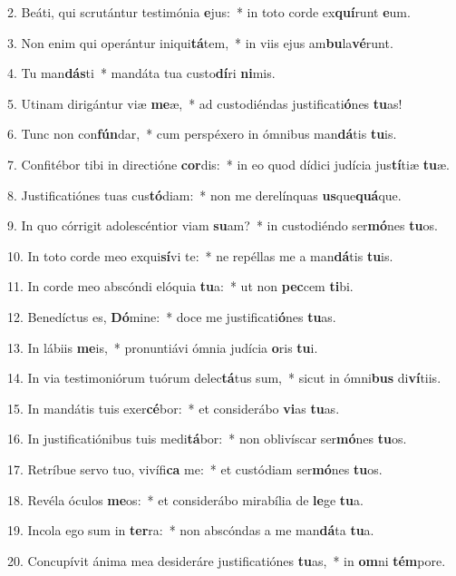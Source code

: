 2. Beáti, qui scrutántur testimónia \textbf{e}jus:~*  in toto corde ex\textbf{quí}runt \textbf{e}um.\

3. Non enim qui operántur iniqui\textbf{tá}tem,~*  in viis ejus am\textbf{bu}la\textbf{vé}runt.\

4. Tu man\textbf{dás}ti~*  mandáta tua custo\textbf{dí}ri \textbf{ni}mis.\

5. Utinam dirigántur viæ \textbf{me}æ,~*  ad custodiéndas justificati\textbf{ó}nes \textbf{tu}as!\

6. Tunc non con\textbf{fún}dar,~*  cum perspéxero in ómnibus man\textbf{dá}tis \textbf{tu}is.\

7. Confitébor tibi in directióne \textbf{cor}dis:~*  in eo quod dídici judícia jus\textbf{tí}tiæ \textbf{tu}æ.\

8. Justificatiónes tuas cus\textbf{tó}diam:~*  non me derelínquas \textbf{us}que\textbf{quá}que.\

9. In quo córrigit adolescéntior viam \textbf{su}am?~*  in custodiéndo ser\textbf{mó}nes \textbf{tu}os.\

10. In toto corde meo exqui\textbf{sí}vi te:~*  ne repéllas me a man\textbf{dá}tis \textbf{tu}is.\

11. In corde meo abscóndi elóquia \textbf{tu}a:~*  ut non \textbf{pec}cem \textbf{ti}bi.\

12. Benedíctus es, \textbf{Dó}mine:~*  doce me justificati\textbf{ó}nes \textbf{tu}as.\

13. In lábiis \textbf{me}is,~*  pronuntiávi ómnia judícia \textbf{o}ris \textbf{tu}i.\

14. In via testimoniórum tuórum delec\textbf{tá}tus sum,~*  sicut in ómni\textbf{bus} di\textbf{ví}tiis.\

15. In mandátis tuis exer\textbf{cé}bor:~*  et considerábo \textbf{vi}as \textbf{tu}as.\

16. In justificatiónibus tuis medi\textbf{tá}bor:~*  non oblivíscar ser\textbf{mó}nes \textbf{tu}os.\

17. Retríbue servo tuo, vivífi\textbf{ca} me:~*  et custódiam ser\textbf{mó}nes \textbf{tu}os.\

18. Revéla óculos \textbf{me}os:~*  et considerábo mirabília de \textbf{le}ge \textbf{tu}a.\

19. Incola ego sum in \textbf{ter}ra:~*  non abscóndas a me man\textbf{dá}ta \textbf{tu}a.\

20. Concupívit ánima mea desideráre justificatiónes \textbf{tu}as,~*  in \textbf{om}ni \textbf{tém}pore.\

